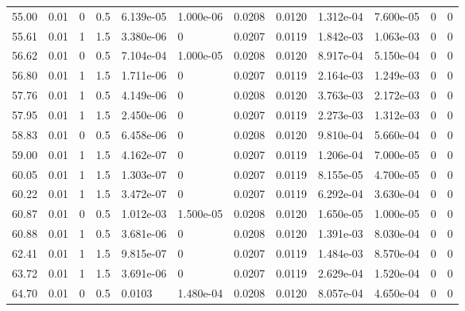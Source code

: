 \documentclass[preview]{standalone}
\begin{document}
{{{\begin{tabular}{L{1.2cm}C{1.2cm} C{0.3cm}C{0.5cm} C{1.4cm}C{1.4cm} C{1.4cm}C{1.4cm} C{1.6cm}C{1.6cm} C{1.6cm}C{1.6cm}}
  55.00  &  0.01  & 0     & 0.5 &  6.139e-05  & 1.000e-06  &  0.0208&   0.0120& 1.312e-04 & 7.600e-05   &  0 & 0  \\ 
  55.61  &  0.01  & 1     & 1.5 &  3.380e-06  & 0  &  0.0207&   0.0119& 1.842e-03 & 1.063e-03   &  0 & 0  \\ 
  56.62  &  0.01  & 0     & 0.5 &  7.104e-04  & 1.000e-05  &  0.0208&   0.0120& 8.917e-04 & 5.150e-04   &  0 & 0  \\ 
  56.80  &  0.01  & 1     & 1.5 &  1.711e-06  & 0  &  0.0207&   0.0119& 2.164e-03 & 1.249e-03   &  0 & 0  \\ 
  57.76  &  0.01  & 1     & 0.5 &  4.149e-06  & 0  &  0.0208&   0.0120& 3.763e-03 & 2.172e-03   &  0 & 0  \\ 
  57.95  &  0.01  & 1     & 1.5 &  2.450e-06  & 0  &  0.0207&   0.0119& 2.273e-03 & 1.312e-03   &  0 & 0  \\ 
  58.83  &  0.01  & 0     & 0.5 &  6.458e-06  & 0  &  0.0208&   0.0120& 9.810e-04 & 5.660e-04   &  0 & 0  \\ 
  59.00  &  0.01  & 1     & 1.5 &  4.162e-07  & 0  &  0.0207&   0.0119& 1.206e-04 & 7.000e-05   &  0 & 0  \\ 
  60.05  &  0.01  & 1     & 1.5 &  1.303e-07  & 0  &  0.0207&   0.0119& 8.155e-05 & 4.700e-05   &  0 & 0  \\ 
  60.22  &  0.01  & 1     & 1.5 &  3.472e-07  & 0  &  0.0207&   0.0119& 6.292e-04 & 3.630e-04   &  0 & 0  \\ 
  60.87  &  0.01  & 0     & 0.5 &  1.012e-03  & 1.500e-05  &  0.0208&   0.0120& 1.650e-05 & 1.000e-05   &  0 & 0  \\ 
  60.88  &  0.01  & 1     & 0.5 &  3.681e-06  & 0  &  0.0208&   0.0120& 1.391e-03 & 8.030e-04   &  0 & 0  \\ 
  62.41  &  0.01  & 1     & 1.5 &  9.815e-07  & 0  &  0.0207&   0.0119& 1.484e-03 & 8.570e-04   &  0 & 0  \\ 
  63.72  &  0.01  & 1     & 1.5 &  3.691e-06  & 0  &  0.0207&   0.0119& 2.629e-04 & 1.520e-04   &  0 & 0  \\ 
  64.70  &  0.01  & 0     & 0.5 &  0.0103  & 1.480e-04  &  0.0208&   0.0120& 8.057e-04 & 4.650e-04   &  0 & 0  \\ 
\hline 
\end{tabular} 

}}}
\end{document}
